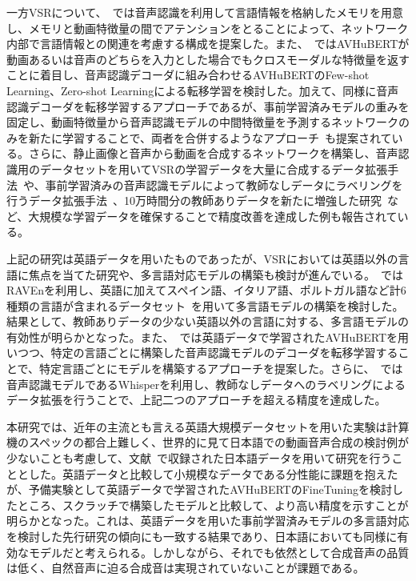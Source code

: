 \documentclass[12pt]{jarticle}
\numberwithin{equation}{section}    %
\numberwithin{figure}{section}      %
\numberwithin{table}{section}      %
\begin{document}
一方VSRについて、~\cite{yeo2024akvsr}では音声認識を利用して言語情報を格納したメモリを用意し、メモリと動画特徴量の間でアテンションをとることによって、ネットワーク内部で言語情報との関連を考慮する構成を提案した。また、~\cite{cheng2023opensr}ではAVHuBERTが動画あるいは音声のどちらを入力とした場合でもクロスモーダルな特徴量を返すことに着目し、音声認識デコーダに組み合わせるAVHuBERTのFew-shot Learning、Zero-shot Learningによる転移学習を検討した。加えて、同様に音声認識デコーダを転移学習するアプローチであるが、事前学習済みモデルの重みを固定し、動画特徴量から音声認識モデルの中間特徴量を予測するネットワークのみを新たに学習することで、両者を合併するようなアプローチ~\cite{djilali2023lip2vec}も提案されている。さらに、静止画像と音声から動画を合成するネットワークを構築し、音声認識用のデータセットを用いてVSRの学習データを大量に合成するデータ拡張手法~\cite{liu2023synthvsr}や、事前学習済みの音声認識モデルによって教師なしデータにラベリングを行うデータ拡張手法~\cite{ma2023auto}、10万時間分の教師ありデータを新たに増強した研究~\cite{chang2024conformer}など、大規模な学習データを確保することで精度改善を達成した例も報告されている。

上記の研究は英語データを用いたものであったが、VSRにおいては英語以外の言語に焦点を当てた研究や、多言語対応モデルの構築も検討が進んでいる。~\cite{zinonos2023learning}ではRAVEnを利用し、英語に加えてスペイン語、イタリア語、ポルトガル語など計6種類の言語が含まれるデータセット~\cite{ephrat2018looking,salesky2021multilingual,zhao2019cascade}を用いて多言語モデルの構築を検討した。結果として、教師ありデータの少ない英語以外の言語に対する、多言語モデルの有効性が明らかとなった。また、~\cite{kim2023lip_vsr}では英語データで学習されたAVHuBERTを用いつつ、特定の言語ごとに構築した音声認識モデルのデコーダを転移学習することで、特定言語ごとにモデルを構築するアプローチを提案した。さらに、~\cite{yeo2023visual}では音声認識モデルであるWhisperを利用し、教師なしデータへのラベリングによるデータ拡張を行うことで、上記二つのアプローチを超える精度を達成した。

本研究では、近年の主流とも言える英語大規模データセットを用いた実験は計算機のスペックの都合上難しく、世界的に見て日本語での動画音声合成の検討例が少ないことも考慮して、文献~\cite{taguchi,esaki}で収録された日本語データを用いて研究を行うこととした。英語データと比較して小規模なデータである分性能に課題を抱えたが、予備実験として英語データで学習されたAVHuBERTのFineTuningを検討したところ、スクラッチで構築したモデルと比較して、より高い精度を示すことが明らかとなった。これは、英語データを用いた事前学習済みモデルの多言語対応を検討した先行研究の傾向にも一致する結果であり、日本語においても同様に有効なモデルだと考えられる。しかしながら、それでも依然として合成音声の品質は低く、自然音声に迫る合成音は実現されていないことが課題である。
\end{document}
